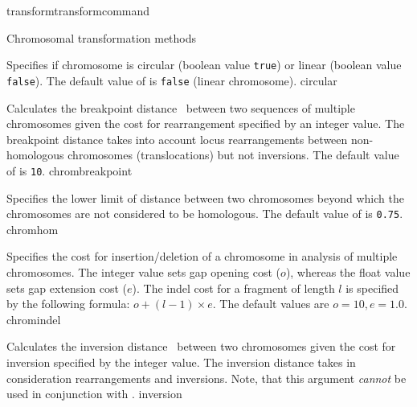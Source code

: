 \begin{command}{transform}{transformcommand}
\begin{arguments}
\begin{argumentgroup}{Chromosomal transformation methods}
\begin{description}
                        {Specifies if chromosome is circular (boolean value 
                        \texttt{true}) or linear (boolean value \texttt{false}).
                        The default value of  is
                        \texttt{false} (linear chromosome).}
                        {circular}
                        
      		 {Calculates the breakpoint distance~\cite{blanchetteetal1997}
                        between two sequences of multiple chromosomes given the cost for
                        rearrangement specified by an integer value. The breakpoint distance
                        takes into account locus rearrangements between non-homologous
                        chromosomes (translocations) but not inversions. The default value of
                         is \texttt{10}.}
                        {chrombreakpoint}
		
                        {Specifies the lower limit of distance between two chromosomes
                        beyond which the chromosomes are not considered to be
                        homologous. The default value of 
                        is \texttt{0.75}.}
                        {chromhom}
                        
                        {Specifies the cost for insertion/deletion of a chromosome in analysis of
                        multiple chromosomes. The integer value sets gap opening
                        cost ($o$), whereas the float value sets gap extension
                        cost ($e$).  The indel cost for a fragment of length $l$ is
                        specified by the following formula:
                       $o + (l-1) \times e$. The default values are $o=10, e=1.0$.}
                        {chromindel}
                        
                        {Calculates the inversion distance~\cite{hanenhalliandpevzner1995}
                        between
                        two chromosomes given the cost for inversion
                        specified by the integer value. The inversion distance
                        takes in consideration rearrangements and
                        inversions.
                        Note, that this argument \emph{cannot} be used in
                        conjunction with .} 
                        {inversion}  


\end{description}
\end{argumentgroup}
\end{arguments}
\end{command}
